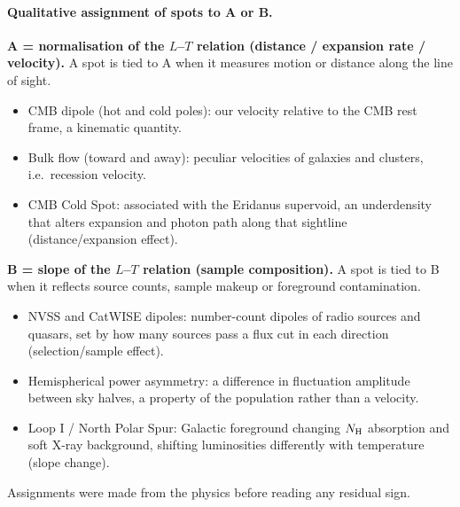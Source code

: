 \documentclass[10pt,twocolumn]{article}
\begin{document}
\paragraph{Qualitative assignment of spots to A or B.}
\textbf{A = normalisation of the $L$--$T$ relation (distance / expansion rate / velocity).} A spot is tied to A when it measures motion or distance along the line of sight.
\begin{itemize}\setlength\itemsep{0pt}
\item CMB dipole (hot and cold poles): our velocity relative to the CMB rest frame, a kinematic quantity.
\item Bulk flow (toward and away): peculiar velocities of galaxies and clusters, i.e.\ recession velocity.
\item CMB Cold Spot: associated with the Eridanus supervoid, an underdensity that alters expansion and photon path along that sightline (distance/expansion effect).
\end{itemize}
\textbf{B = slope of the $L$--$T$ relation (sample composition).} A spot is tied to B when it reflects source counts, sample makeup or foreground contamination.
\begin{itemize}\setlength\itemsep{0pt}
\item NVSS and CatWISE dipoles: number-count dipoles of radio sources and quasars, set by how many sources pass a flux cut in each direction (selection/sample effect).
\item Hemispherical power asymmetry: a difference in fluctuation amplitude between sky halves, a property of the population rather than a velocity.
\item Loop I / North Polar Spur: Galactic foreground changing $N_{\rm H}$ absorption and soft X-ray background, shifting luminosities differently with temperature (slope change).
\end{itemize}
Assignments were made from the physics before reading any residual sign.
\end{document}
